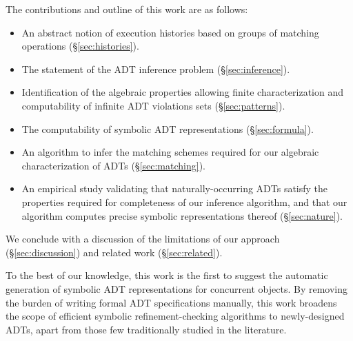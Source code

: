 The contributions and outline of this work are as follows:
\begin{itemize}

  \item An abstract notion of execution histories based on groups of matching
  operations (§\ref{sec:histories}).

  \item The statement of the ADT inference problem (§\ref{sec:inference}).

  \item Identification of the algebraic properties allowing finite
  characterization and computability of infinite ADT violations sets
  (§\ref{sec:patterns}).

  \item The computability of symbolic ADT representations (§\ref{sec:formula}).

  \item An algorithm to infer the matching schemes required for our algebraic
  characterization of ADTs (§\ref{sec:matching}).

  \item An empirical study validating that naturally-occurring ADTs satisfy the
  properties required for completeness of our inference algorithm, and that our
  algorithm computes precise symbolic representations thereof
  (§\ref{sec:nature}).

\end{itemize}
We conclude with a discussion of the limitations of our approach
(§\ref{sec:discussion}) and related work (§\ref{sec:related}).

To the best of our knowledge, this work is the first to suggest the automatic
generation of symbolic ADT representations for concurrent objects. By removing
the burden of writing formal ADT specifications manually, this work broadens
the scope of efficient symbolic refinement-checking algorithms to
newly-designed ADTs, apart from those few traditionally studied in the
literature.
